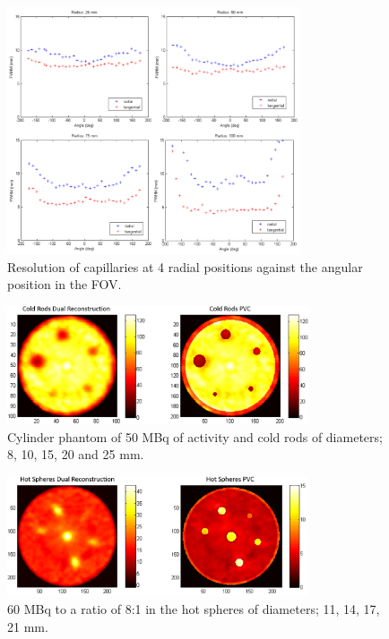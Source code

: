 \begin{figure}[!t]
\centering
\includegraphics[width=3.4in]{figures/resolutions.png}

\caption{Resolution of capillaries at 4 radial positions against the angular position in the FOV.}
\label{fig_resolution}
\end{figure}

\begin{figure}[!t]
\centering
\includegraphics[width=3.5in]{figures/ColdRods.png}

\caption{Cylinder phantom of 50 MBq of activity and cold rods of diameters; 8, 10, 15, 20 and 25 mm.}
\label{fig_cold}
\end{figure}

\begin{figure}[!t]
\centering
\includegraphics[width=3.5in]{figures/HotSpheres.png}

\caption{60 MBq to a ratio of 8:1 in the hot spheres of diameters; 11, 14, 17, 21 mm.}
\label{fig_Hot}
\end{figure}

